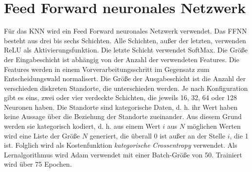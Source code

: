 \section{Feed Forward neuronales Netzwerk}
\label{sec:model_ffnn}
Für das KNN wird ein Feed Forward neuronales Netzwerk verwendet.
Das FFNN besteht aus drei bis sechs Schichten.
Alle Schichten, außer der letzten, verwenden ReLU als Aktivierungsfunktion.
Die letzte Schicht verwendet SoftMax.
\newline
\newline
Die Größe der Eingabeschicht ist abhängig von der Anzahl der verwendeten Features.
Die Features werden in einem Vorverarbeitungsschritt im Gegensatz zum Entscheidungswald normalisert.
Die Größe der Ausgabeschicht ist die Anzahl der verschieden diskreten Standorte, die unterschieden werden.
Je nach Konfiguration gibt es eins, zwei oder vier verdeckte Schichten, die jeweils 16, 32, 64 oder 128 Neuronen haben.
\newline
\newline
Die Standorte sind kategorische Daten, d. h. ihr Wert haben keine Aussage über die Beziehung der Standorte zueinander.
Aus diesem Grund werden sie kategorisch kodiert, d. h. aus einem Wert $i$ aus $N$ möglichen Werten wird eine Liste der Größe $N$ generiert,
die überall 0 ist außer an der Stelle $i$, die 1 ist.
Folglich wird als Kostenfunktion \textit{kategorische Crossentropy} verwendet.
Als Lernalgorithmus wird Adam verwendet mit einer Batch-Größe von 50.
Trainiert wird über 75 Epochen.